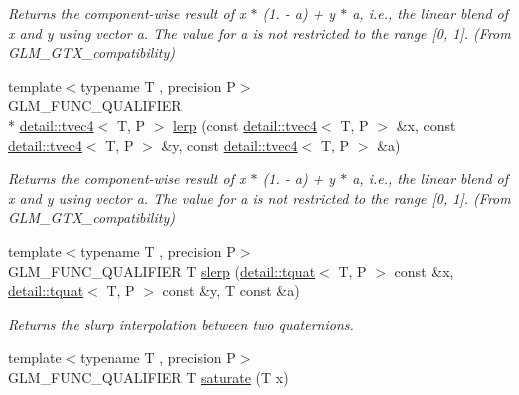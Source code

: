 \begin{DoxyCompactItemize}
\begin{DoxyCompactList}\small\item\em Returns the component-\/wise result of x $\ast$ (1. -\/ a) + y $\ast$ a, i.\-e., the linear blend of x and y using vector a. The value for a is not restricted to the range \mbox{[}0, 1\mbox{]}. (From G\-L\-M\-\_\-\-G\-T\-X\-\_\-compatibility) \end{DoxyCompactList}\item 
\hypertarget{group__gtx__compatibility_ga48f60aeee275f1848cfc60a85fde96f2}{{\footnotesize template$<$typename T , precision P$>$ }\\G\-L\-M\-\_\-\-F\-U\-N\-C\-\_\-\-Q\-U\-A\-L\-I\-F\-I\-E\-R \\*
\hyperlink{structglm_1_1detail_1_1tvec4}{detail\-::tvec4}$<$ T, P $>$ \hyperlink{group__gtx__compatibility_ga48f60aeee275f1848cfc60a85fde96f2}{lerp} (const \hyperlink{structglm_1_1detail_1_1tvec4}{detail\-::tvec4}$<$ T, P $>$ \&x, const \hyperlink{structglm_1_1detail_1_1tvec4}{detail\-::tvec4}$<$ T, P $>$ \&y, const \hyperlink{structglm_1_1detail_1_1tvec4}{detail\-::tvec4}$<$ T, P $>$ \&a)}\label{group__gtx__compatibility_ga48f60aeee275f1848cfc60a85fde96f2}

\begin{DoxyCompactList}\small\item\em Returns the component-\/wise result of x $\ast$ (1. -\/ a) + y $\ast$ a, i.\-e., the linear blend of x and y using vector a. The value for a is not restricted to the range \mbox{[}0, 1\mbox{]}. (From G\-L\-M\-\_\-\-G\-T\-X\-\_\-compatibility) \end{DoxyCompactList}\item 
{\footnotesize template$<$typename T , precision P$>$ }\\G\-L\-M\-\_\-\-F\-U\-N\-C\-\_\-\-Q\-U\-A\-L\-I\-F\-I\-E\-R T \hyperlink{group__gtx__compatibility_gaa47df8c302c9b42c813da3f658f90e1a}{slerp} (\hyperlink{structglm_1_1detail_1_1tquat}{detail\-::tquat}$<$ T, P $>$ const \&x, \hyperlink{structglm_1_1detail_1_1tquat}{detail\-::tquat}$<$ T, P $>$ const \&y, T const \&a)
\begin{DoxyCompactList}\small\item\em Returns the slurp interpolation between two quaternions. \end{DoxyCompactList}\item 
\hypertarget{group__gtx__compatibility_ga0fd09e616d122bc2ed9726682ffd44b7}{{\footnotesize template$<$typename T , precision P$>$ }\\G\-L\-M\-\_\-\-F\-U\-N\-C\-\_\-\-Q\-U\-A\-L\-I\-F\-I\-E\-R T \hyperlink{group__gtx__compatibility_ga0fd09e616d122bc2ed9726682ffd44b7}{saturate} (T x)}\label{group__gtx__compatibility_ga0fd09e616d122bc2ed9726682ffd44b7}


\end{DoxyCompactItemize}
